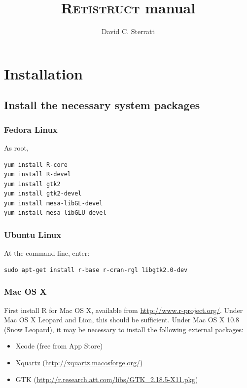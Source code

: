 \documentclass{article}
\title{\textsc{Retistruct} manual}
\author{David C. Sterratt}
\begin{document}
\maketitle
\thispagestyle{myheadings}

\section{Installation}
\label{manual:sec:installation}

\subsection{Install the necessary system packages}

\subsubsection{Fedora Linux }

As root,

\begin{verbatim}
yum install R-core
yum install R-devel
yum install gtk2
yum install gtk2-devel
yum install mesa-libGL-devel
yum install mesa-libGLU-devel
\end{verbatim}

\subsubsection{Ubuntu Linux}
At the command line, enter:

\begin{verbatim}
sudo apt-get install r-base r-cran-rgl libgtk2.0-dev
\end{verbatim}

\subsubsection{Mac OS X}
\label{retistruct-manual:sec:mac}

First install R for Mac OS X, available from
\url{http://www.r-project.org/}. Under Mac OS X Leopard and Lion, this
should be sufficient. Under Mac OS X 10.8 (Snow Leopard), it may be
necessary to install the following external packages:
\begin{itemize}
\item Xcode (free from App Store)
\item Xquartz (\href{http://xquartz.macosforge.org/}{http://xquartz.macosforge.org/})
\item GTK (\href{http://r.research.att.com/libs/GTK_2.18.5-X11.pkg}{http://r.research.att.com/libs/GTK\_2.18.5-X11.pkg})
\end{itemize}
\end{document}

